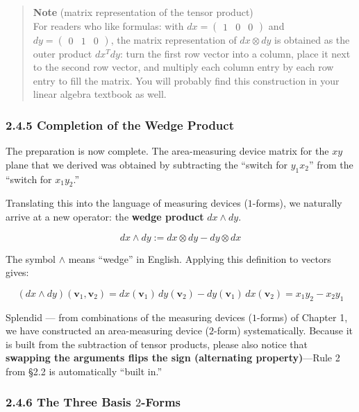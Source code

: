 \begin{quote}
\textbf{Note} (matrix representation of the tensor product)\\
For readers who like formulas: with
\(dx = \begin{pmatrix} 1 & 0 & 0 \end{pmatrix}\) and
\(dy = \begin{pmatrix} 0 & 1 & 0 \end{pmatrix}\), the matrix
representation of \(dx \otimes dy\) is obtained as the outer product
\(dx^T dy\): turn the first row vector into a column, place it next to
the second row vector, and multiply each column entry by each row entry
to fill the matrix. You will probably find this construction in your
linear algebra textbook as well.
\end{quote}

\hypertarget{completion-of-the-wedge-product}{%
\subsubsection{2.4.5 Completion of the Wedge
Product}\label{completion-of-the-wedge-product}}

The preparation is now complete. The area-measuring device matrix for
the \(xy\) plane that we derived was obtained by subtracting the
``switch for \(y_1 x_2\)'' from the ``switch for \(x_1 y_2\).''

Translating this into the language of measuring devices (\(1\)-forms),
we naturally arrive at a new operator: the \textbf{wedge product}
\(dx \wedge dy\).

\[
dx \wedge dy := dx \otimes dy - dy \otimes dx
\]

The symbol \(\wedge\) means ``wedge'' in English. Applying this
definition to vectors gives:

\[
(dx \wedge dy)(\mathbf{v}_1, \mathbf{v}_2) = dx(\mathbf{v}_1)\,dy(\mathbf{v}_2) - dy(\mathbf{v}_1)\,dx(\mathbf{v}_2) = x_1 y_2 - x_2 y_1
\]

Splendid --- from combinations of the measuring devices (\(1\)-forms) of
Chapter 1, we have constructed an area-measuring device (\(2\)-form)
systematically. Because it is built from the subtraction of tensor
products, please also notice that
\textbf{swapping the arguments flips the sign (alternating property)}---Rule
2 from §2.2 is automatically ``built in.''

\hypertarget{the-three-basis-2-forms}{%
\subsubsection{\texorpdfstring{2.4.6 The Three Basis
\(2\)-Forms}{2.4.6 The Three Basis 2-Forms}}\label{the-three-basis-2-forms}}


